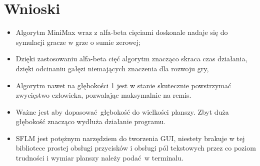 \documentclass[12pt]{article}
\begin{document}
            \section{Wnioski}
            \begin{itemize}
                \item Algorytm MiniMax wraz z alfa-beta cięciami doskonale nadaje się do symulacji gracze w grze o sumie zerowej;
                \item Dzięki zastosowaniu alfa-beta cięć algorytm znacząco skraca czas działania, dzięki odcinaniu gałęzi niemających znaczenia dla rozwoju gry,
                \item Algorytm nawet na głębokości 1 jest w stanie skutecznie powstrzymać zwycięstwo człowieka, pozwalając maksymalnie na remis.
                \item Ważne jest aby dopasować głębokość do wielkości planszy. Zbyt duża głębokość znacząco wydłuża działanie programu.
                \item SFLM jest potężnym narzędziem do tworzenia GUI, niestety brakuje w tej bibliotece prostej obsługi przycisków i obsługi pól tekstowych przez co poziom trudności i wymiar planszy należy podać w terminalu.
            \end{itemize}
\end{document}
